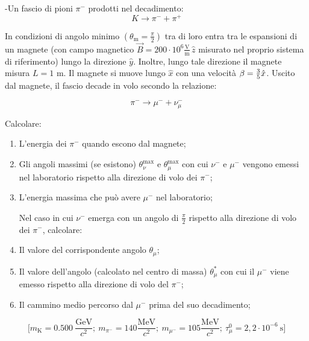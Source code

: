 \documentclass[12pt,twoside,a4]{article}
\begin{document}
\begin{esercizio}
	-Un fascio di pioni $\pi^-$ prodotti nel decadimento:
	\begin{equation*}
		K \rightarrow \pi^- + \pi^+
	\end{equation*}

In condizioni di angolo minimo $\left(\theta_\mathrm{m} = \frac{\pi}{2} \right)$  tra di loro entra tra le espansioni di un magnete (con campo magnetico $\vec{B} = 200 \cdot 10^6 \frac{\mathrm{V}}{\mathrm{m}} \, \hat{z}$ misurato nel proprio sistema di riferimento) lungo la direzione $\hat{y}$. Inoltre, lungo tale direzione il magnete misura $L = 1$ m. Il magnete si muove lungo $\hat{x}$ con una velocità $\vec{$\beta$} = \frac{3}{5} \hat{x}$. 
   Uscito dal magnete, il fascio decade in volo secondo la relazione: 

\begin{equation*}
		\pi^- \rightarrow \mu^- + \nu^-_\mu
\end{equation*}

Calcolare:
\begin{enumerate}[label=(\textit{\roman*})]
	\item L'energia dei $\pi^-$ quando escono dal magnete;
	\item Gli angoli massimi (se esistono) $\theta^\mathrm{max}_\nu$ e $\theta^\mathrm{max}_\mu$ con cui $\nu^-$ e $\mu^-$ vengono emessi nel laboratorio rispetto alla direzione di volo dei $\pi^-$;
	\item L'energia massima che può avere $\mu^-$ nel laboratorio; 

Nel caso in cui $\nu^-$ emerga con un angolo di $\frac{\pi}{2}$ rispetto alla direzione di volo dei $\pi^-$, calcolare: 

	\item Il valore del corrispondente angolo $\theta_\mu$;
	\item Il valore dell'angolo (calcolato nel centro di massa) $\theta^\ast_\mu$ con cui il $\mu^-$ viene emesso rispetto alla direzione di volo del $\pi^-$;
	\item Il cammino medio percorso dal $\mu^-$ prima del suo decadimento; 
\end{enumerate}

\begin{equation*}
	\Big[ m_\mathrm{K} = 0.500 \ \frac{\mathrm{GeV}}{c^2}; \ m_{\pi^-}=140 \frac{\mathrm{MeV}}{c^2}; \ m_{\mu^-} = 105 \frac{\mathrm{MeV}}{c^2}; \ \tau_\mu^0 = 2,2 \cdot 10^{-6} \ \mathrm{s} \Big] 
\end{equation*}
\end{esercizio}
\end{document}
